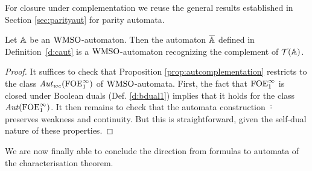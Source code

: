 For closure under complementation we reuse the general results established in Section \ref{sec:parityaut} for parity automata.

\begin{proposition}
\label{t:cl-cmp}
Let $\mathbb{A}$ be an $\mathrm{WMSO}$-automaton.
Then the automaton $\overline{\mathbb{A}}$ defined in Definition~\ref{d:caut} is a
$\mathrm{WMSO}$-automaton recognizing the complement of $\mathcal{T}(\mathbb{A})$.
\end{proposition}

\begin{proof} It suffices to check that Proposition \ref{prop:autcomplementation} restricts to the class $\mathit{Aut}_{wc}(\mathrm{FOE}^{\infty}_1)$ of $\mathrm{WMSO}$-automata. First, the fact that $\mathrm{FOE}^{\infty}_1$ is closed under Boolean duals (Def. \ref{d:bdual1}) implies that it holds for the class $\mathit{Aut}(\mathrm{FOE}^{\infty}_1)$. It then remains to check that the automata construction $\overline{\cdot}$ preserves weakness and continuity. But this is straightforward, given the self-dual nature of these properties.\end{proof}



We are now finally able to conclude the direction from formulas to automata of the characterisation theorem.

